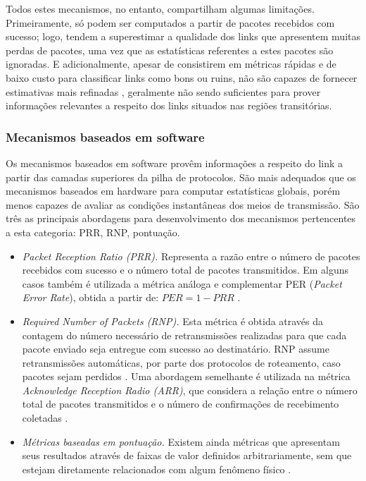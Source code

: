 \documentclass[
	12pt,				%
	openright,			%
	oneside,
	a4paper,			%
	english,			%
	french,				%
	spanish,			%
	brazil				%
	]{abntex2}
\begin{document}
	Todos estes mecanismos, no entanto, compartilham algumas limitações. Primeiramente, só podem ser computados a partir de pacotes recebidos com sucesso; logo, tendem a superestimar a qualidade dos links que apresentem muitas perdas de pacotes, uma vez que as estatísticas referentes a estes pacotes são ignoradas. E adicionalmente, apesar de consistirem em métricas rápidas e de baixo custo para classificar links como bons ou ruins, não são capazes de fornecer estimativas mais refinadas \cite{Baccour2012}, geralmente não sendo suficientes para prover informações relevantes a respeito dos links situados nas regiões transitórias.
	
\subsubsection{Mecanismos baseados em software}

Os mecanismos baseados em software provêm informações a respeito do link a partir das camadas superiores da pilha de protocolos. São mais adequados que os mecanismos baseados em hardware para computar estatísticas globais, porém menos capazes de avaliar as condições instantâneas dos meios de transmissão. São três as principais abordagens para desenvolvimento dos mecanismos pertencentes a esta categoria: PRR, RNP, pontuação.

\begin{itemize}
	\item \textit{Packet Reception Ratio (PRR).} Representa a razão entre o número de pacotes recebidos com sucesso e o número total de pacotes transmitidos. Em alguns casos também é utilizada a métrica análoga e complementar PER (\textit{Packet Error Rate}), obtida a partir de: $PER = 1 - PRR$ \cite{Baccour2012}.
	\item \textit{Required Number of Packets (RNP).} Esta métrica é obtida através da contagem do número necessário de retransmissões realizadas para que cada pacote enviado seja entregue com sucesso ao destinatário. RNP assume retransmissões automáticas, por parte dos protocolos de roteamento, caso pacotes sejam perdidos \cite{Cerpa2005}. Uma abordagem semelhante é utilizada na métrica \textit{Acknowledge Reception Radio (ARR)}, que considera a relação entre o número total de pacotes transmitidos e o número de confirmações de recebimento coletadas \cite{Baccour2012}.
	\item \textit{Métricas baseadas em pontuação.} Existem ainda métricas que apresentam seus resultados através de faixas de valor definidos arbitrariamente, sem que estejam diretamente relacionados com algum fenômeno físico \cite{Baccour2012}.
\end{itemize}
\end{document}
